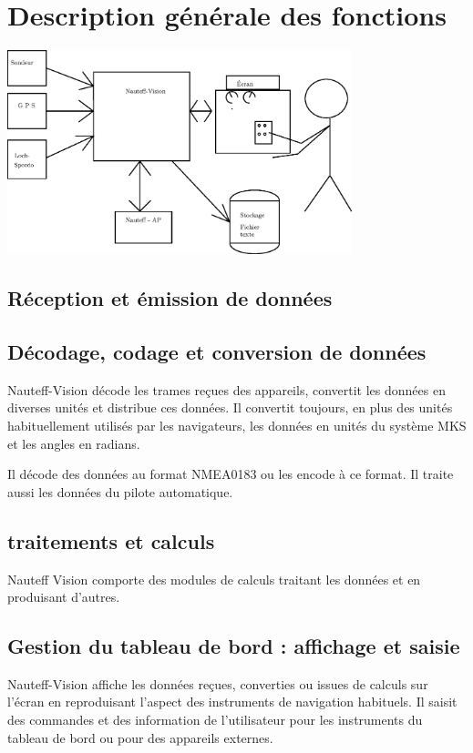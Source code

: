 \documentclass[a4paper,11pt]{report}
\begin{document}
\section{Description générale des fonctions}

\includegraphics[width=10cm]{figures/Nauteff-Vision-envt.eps}

\subsection{Réception et émission de données}



\subsection{Décodage, codage et conversion de données}

Nauteff-Vision décode les trames reçues des appareils,
convertit les données en diverses unités et distribue ces données.
Il convertit toujours, en plus des unités habituellement utilisés
par les navigateurs, les données en unités du système MKS et les angles en radians.

Il décode des données au format \gls{NMEA0183} ou les encode à ce format.
Il traite aussi les données du pilote automatique.


\subsection{traitements et calculs}

Nauteff Vision comporte des modules de calculs traitant les données
et en produisant d'autres.


\subsection{Gestion du tableau de bord : affichage et saisie}

Nauteff-Vision affiche les données reçues, converties ou issues de calculs sur l'écran
en reproduisant l'aspect des instruments de navigation habituels.
Il saisit des commandes et des information de l'utilisateur
pour les instruments du tableau de bord ou pour des appareils externes.
\end{document}
